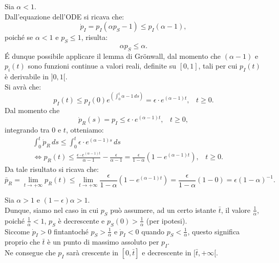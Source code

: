 \documentclass[11pt,largemargins]{homework}
\begin{document}
\begin {alphaparts}
  
  \newpage
 \questionpart
 Sia $\alpha < 1$.\\
 Dall'equazione dell'ODE si ricava che:
 \begin{equation*}
 \dot{p}_{I}=p_{I}\left(\alpha p_{S}-1\right)\leq p_{I}\left(\alpha-1\right),
\end{equation*}  
poiché se $\alpha<1$ e $p_{S}\leq 1$, risulta:
\begin{equation*}
\alpha p_{S}\leq \alpha.
\end{equation*}
\'E dunque possibile applicare il lemma di Gr\"onwall, dal momento che $\left(\alpha-1\right)$ e $p_{i}\left(t\right)$ sono funzioni continue a valori reali, definite su $[0,1]$, tali per cui $p_{I}\left(t\right)$ è derivabile in $]0,1[$.\\
Si avrà che:
\begin{equation*}
p_{I}\left(t\right)\leq p_{I}\left(0\right)e^{\left(\int_{0}^{t} \alpha-1 \,ds\right)}=\epsilon\cdot e^{\left(\alpha - 1\right)t}, \,\,\,\,\, t\geq 0.
\end{equation*}
Dal momento che
\begin{equation*}
\dot{p}_{R}\left(s\right)=p_{I}\leq \epsilon\cdot e^{\left(\alpha - 1\right)t}, \,\,\,\,\, t\geq 0,
\end{equation*}
integrando tra $0$ e $t$, otteniamo:
\begin{align*}
\int_{0}^{t} \dot{p}_{R} \,ds \leq \int_{0}^{t} \epsilon\cdot e^{\left(\alpha - 1\right)s} \,ds && \\
\Leftrightarrow p_{R}\left(t\right)\leq \frac{\epsilon\cdot e^{\left(\alpha - 1\right)t}}{\alpha-1} - \frac{\epsilon}{\alpha-1}= \frac{\epsilon}{1-\alpha}\left(1-e^{\left(\alpha-1\right)t}\right), \,\,\,\,\, t\geq 0.
\end{align*}
Da tale risultato si ricava che:
\begin{equation*}
\bar{p}_{R}=\lim\limits_{t \rightarrow +\infty}p_{R}\left(t\right)\leq \lim\limits_{t \rightarrow +\infty}\frac{\epsilon}{1-\alpha}\left(1-e^{\left(\alpha-1\right)t}\right)=\frac{\epsilon}{1-\alpha}\left(1-0\right)=\epsilon\left(1-\alpha\right)^{-1}.
\end{equation*}

\questionpart
Sia $\alpha>1$ e $\left(1-\epsilon\right)\alpha>1$.\\
Dunque, siamo nel caso in cui $p_{S}$ può assumere, ad un certo istante $\bar{t}$, il valore $\frac{1}{\alpha}$, poiché $\frac{1}{\alpha}<1$, $p_{S}$ è decrescente e $p_{S}\left(0\right)>\frac{1}{\alpha}$ (per ipotesi).\\
Siccome $\dot{p}_{I}>0$ fintantoché $p_{S} >\frac{1}{\alpha}$ e $\dot{p}_{I}<0$ quando $p_{S}<\frac{1}{\alpha}$, questo significa proprio che $\bar{t}$ è un punto di massimo assoluto per $p_{I}$.\\
Ne consegue che $p_{I}$ sarà crescente in $[0,\bar{t}]$ e decrescente in $[\bar{t},+\infty[$.


\end{alphaparts}
\end{document}
